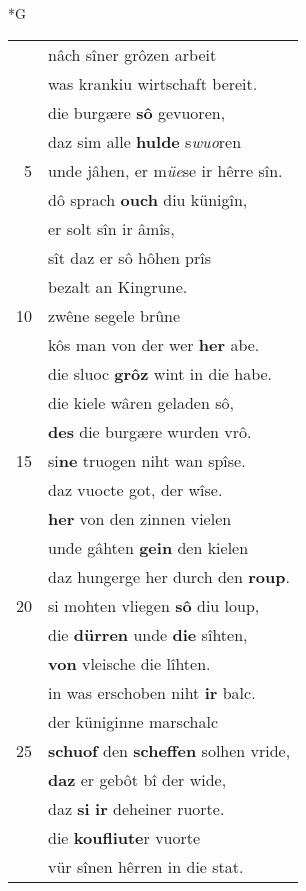 \documentclass[8pt,a4paper,notitlepage]{article}
\begin{document}
\begin{table}[ht]
\begin{minipage}[t]{0.5\linewidth}
\small
\begin{center}*G
\end{center}
\begin{tabular}{rl}
 & nâch sîner grôzen arbeit\\ 
 & was krankiu wirtschaft bereit.\\ 
 & die burgære \textbf{sô} gevuoren,\\ 
 & daz sim alle \textbf{hulde} s\textit{wuo}ren\\ 
5 & unde jâhen, er m\textit{üe}se ir hêrre sîn.\\ 
 & dô sprach \textbf{ouch} diu künigîn,\\ 
 & er solt sîn ir âmîs,\\ 
 & sît daz er sô hôhen prîs\\ 
 & bezalt an Kingrune.\\ 
10 & zwêne segele brûne\\ 
 & kôs man von der wer \textbf{her} abe.\\ 
 & die sluoc \textbf{grôz} wint in die habe.\\ 
 & die kiele wâren geladen sô,\\ 
 & \textbf{des} die burgære wurden vrô.\\ 
15 & si\textbf{ne} truogen niht wan spîse.\\ 
 & daz vuocte got, der wîse.\\ 
 & \textbf{her} von den zinnen vielen\\ 
 & unde gâhten \textbf{gein} den kielen\\ 
 & daz hungerge her durch den \textbf{roup}.\\ 
20 & si mohten vliegen \textbf{sô} diu loup,\\ 
 & die \textbf{dürren} unde \textbf{die} sîhten,\\ 
 & \textbf{von} vleische die lîhten.\\ 
 & in was erschoben niht \textbf{ir} balc.\\ 
 & der küniginne marschalc\\ 
25 & \textbf{schuof} den \textbf{scheffen} solhen vride,\\ 
 & \textbf{daz} er gebôt bî der wide,\\ 
 & daz \textbf{si} \textbf{ir} deheiner ruorte.\\ 
 & die \textbf{koufliute}r vuorte\\ 
 & vür sînen hêrren in die stat.\\ 

\end{tabular}
\end{minipage}
\end{table}
\end{document}
